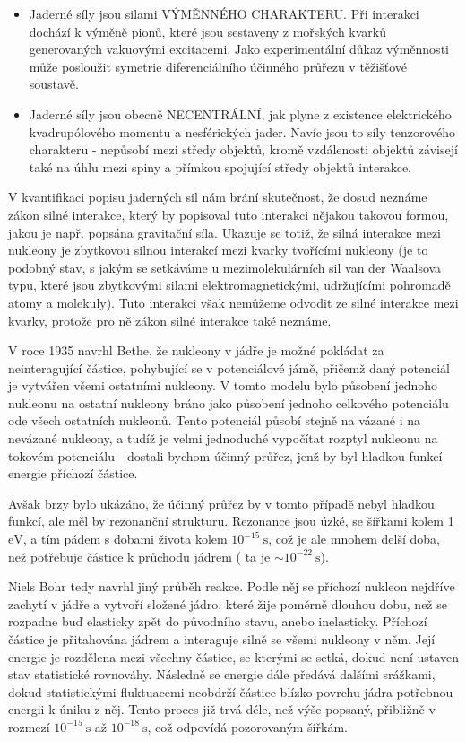 \documentclass[../../main.tex]{subfiles}
\begin{document}
\begin{itemize}
	\item Jaderné síly jsou silami VÝMĚNNÉHO CHARAKTERU. Při interakci dochází k výměně pionů, které jsou sestaveny z mořských kvarků generovaných vakuovými excitacemi. Jako experimentální důkaz výměnnosti může posloužit symetrie diferenciálního účinného průřezu v těžišťové soustavě.
	
	\item Jaderné síly jsou obecně NECENTRÁLNÍ, jak plyne z existence elektrického kvadrupólového momentu a nesférických jader. Navíc jsou to síly tenzorového charakteru - nepůsobí mezi středy objektů, kromě vzdálenosti objektů závisejí také na úhlu mezi spiny a přímkou spojující středy objektů interakce. 
\end{itemize} 
	V kvantifikaci popisu jaderných sil nám brání skutečnost, že dosud neznáme zákon silné interakce, který by popisoval tuto interakci nějakou takovou formou, jakou je např. popsána gravitační síla. Ukazuje se totiž, že silná interakce mezi nukleony je zbytkovou silnou interakcí mezi kvarky tvořícími nukleony (je to podobný stav, s jakým se setkáváme u mezimolekulárních sil van der Waalsova typu, které jsou zbytkovými silami elektromagnetickými, udržujícími pohromadě atomy a molekuly). Tuto interakci však nemůžeme odvodit ze silné interakce  mezi kvarky, protože pro ně zákon silné interakce také neznáme.
	
	V roce 1935 navrhl Bethe, že nukleony v jádře je možné pokládat za neinteragující částice, pohybující se v potenciálové jámě, přičemž daný potenciál je vytvářen všemi ostatními nukleony. V tomto modelu bylo působení jednoho nukleonu na ostatní nukleony bráno jako působení jednoho celkového potenciálu ode všech ostatních nukleonů. Tento potenciál působí stejně na vázané i na nevázané nukleony, a tudíž je velmi jednoduché vypočítat rozptyl nukleonu na tokovém potenciálu - dostali bychom účinný průřez, jenž by byl hladkou funkcí energie příchozí částice.
	
	Avšak brzy bylo ukázáno, že účinný průřez by v tomto případě nebyl hladkou funkcí, ale měl by rezonanční strukturu. Rezonance jsou úzké, se šířkami kolem 1 $\mathrm{eV}$, a tím pádem s dobami života kolem $10^{-15} ~\mathrm{s}$, což je ale mnohem delší doba, než potřebuje částice k průchodu jádrem ( ta je $ \sim 10^{-22} ~\mathrm{s}$).
	
	Niels Bohr tedy navrhl jiný průběh reakce. Podle něj se příchozí nukleon nejdříve zachytí v jádře a vytvoří složené jádro, které žije poměrně dlouhou dobu, než se rozpadne buď elasticky zpět do původního stavu, anebo inelasticky. Příchozí částice je přitahována jádrem a interaguje silně se všemi nukleony v něm. Její energie je rozdělena mezi všechny částice, se kterými se setká, dokud není ustaven stav statistické rovnováhy. Následně se energie dále předává dalšími srážkami, dokud statistickými fluktuacemi neobdrží částice blízko povrchu jádra potřebnou energii k úniku z něj. Tento proces již trvá déle, než výše popsaný, přibližně v rozmezí $10^{-15} ~\mathrm{s}$ až $10^{-18} ~\mathrm{s}$, což odpovídá pozorovaným šířkám. 
	
\end{document}
